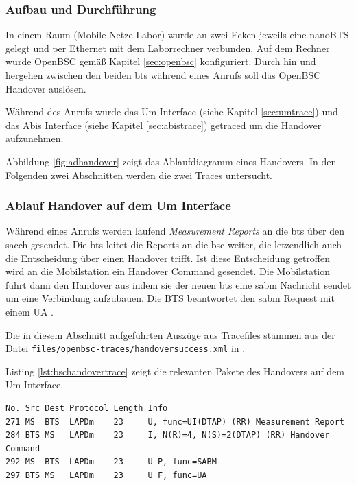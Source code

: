 \subsubsection{Aufbau und Durchführung}
In einem Raum (Mobile Netze Labor) wurde an zwei Ecken jeweils eine nanoBTS gelegt und per Ethernet mit dem Laborrechner verbunden. Auf dem Rechner wurde OpenBSC gemäß Kapitel \ref{sec:openbsc} konfiguriert. Durch hin und hergehen zwischen den beiden \gls{bts} während eines Anrufs soll das OpenBSC Handover auslösen.

Während des Anrufs wurde das Um Interface (siehe Kapitel \ref{sec:umtrace}) und das Abis Interface (siehe Kapitel \ref{sec:abistrace}) getraced um die Handover aufzunehmen.

Abbildung \ref{fig:adhandover} zeigt das Ablaufdiagramm eines Handovers. In den Folgenden zwei Abschnitten werden die zwei Traces untersucht. 

\subsubsection{Ablauf Handover auf dem Um Interface}\label{sec:obsc-um}

Während eines Anrufs werden laufend \textit{Measurement Reports} an die \gls{bts} über den \gls{sacch} gesendet. Die \gls{bts} leitet die Reports an die \gls{bsc} weiter, die letzendlich auch die Entscheidung über einen Handover trifft. Ist diese Entscheidung getroffen wird an die Mobilstation ein Handover Command gesendet. Die Mobilstation führt dann den Handover aus indem sie der neuen \gls{bts} eine \gls{sabm} Nachricht sendet um eine Verbindung aufzubauen. Die BTS beantwortet den \gls{sabm} Request mit einem \gls{UA} \cite[3.4.4]{bib:3gpp0408}\cite[3.1.5]{bib:3gpp0408} \cite[1.7.4]{bib:grundkursmks}.

Die in diesem Abschnitt aufgeführten Auszüge aus Tracefiles stammen aus der Datei \lstinline{files/openbsc-traces/handoversuccess.xml} in \cite{bib:githubfiles}.

Listing \ref{lst:bschandovertrace} zeigt die relevanten Pakete des Handovers auf dem Um Interface.

\begin{lstlisting}[label=lst:bschandovertrace,caption={Übersicht über die gesendeten Pakete auf dem Um Interface},numbers=none]
No. Src Dest Protocol Length Info
271	MS	BTS  LAPDm	  23     U, func=UI(DTAP) (RR) Measurement Report 
284	BTS	MS   LAPDm	  23     I, N(R)=4, N(S)=2(DTAP) (RR) Handover Command 
292	MS  BTS  LAPDm    23     U P, func=SABM
297	BTS MS   LAPDm	  23     U F, func=UA
\end{lstlisting}

